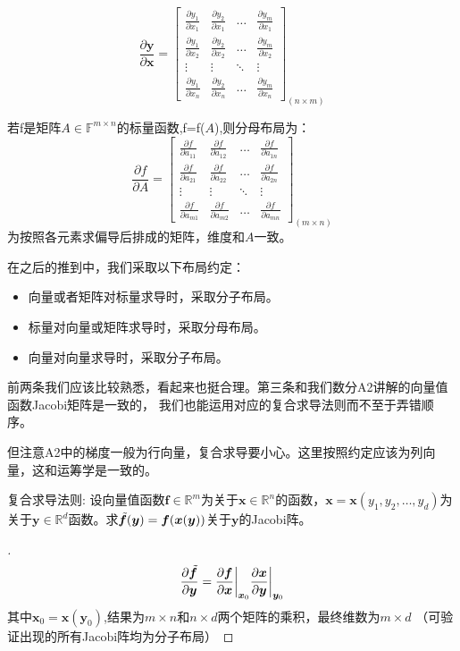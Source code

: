 \documentclass[cn,hazy,green,12pt,normal]{elegantnote}
\newcommand{\p}{\partial}
\newcommand{\MR}{\mathbb R}
\newcommand{\MF}{\mathbb F}
\numberwithin{equation}{section}
\numberwithin{subsection}{section}
\begin{document}
\[
\frac{\p \bm y}{\p \bm x} = \begin{bmatrix}
\frac{\p y_1}{\p x_1} &\frac{\p y_2}{\p x_1}  & \dotsc  & \frac{\p y_m}{\p x_1} \\
 \frac{\p y_1}{\p x_2}&\frac{\p y_2}{\p x_2}  &\dotsc  & \frac{\p y_m}{\p x_2}\\
\vdots  & \vdots  & \ddots  & \vdots \\
\frac{\p y_1}{\p x_n} & \frac{\p y_2}{\p x_n}  & \dotsc  & \frac{\p y_m}{\p x_n}
\end{bmatrix}_{(n\times m)}
\]

若f是矩阵$A\in \MF^{m\times n}$的标量函数,f=f($A$),则分母布局为：
\[
\frac{\p f}{\p A} = \begin{bmatrix}
\frac{\p f}{\p a_{11}} &\frac{\p f}{\p a_{12}}  & \dotsc  & \frac{\p f}{\p a_{1n}} \\
 \frac{\p f}{\p a_{21}}&\frac{\p f}{\p a_{22}}  &\dotsc  & \frac{\p f}{\p a_{2n}}\\
\vdots  & \vdots  & \ddots  & \vdots \\
\frac{\p f}{\p a_{m1}} & \frac{\p f}{\p a_{m2}}  & \dotsc  & \frac{\p f}{\p a_{mn}}
\end{bmatrix}_{(m\times n)}
\]
为按照各元素求偏导后排成的矩阵，维度和$A$一致。

在之后的推到中，我们采取以下布局约定：
\begin{itemize}
    \item 向量或者矩阵对标量求导时，采取分子布局。
    \item 标量对向量或矩阵求导时，采取分母布局。
    \item 向量对向量求导时，采取分子布局。
\end{itemize}

\begin{note}
    前两条我们应该比较熟悉，看起来也挺合理。第三条和我们数分A2讲解的向量值函数Jacobi矩阵是一致的，
    我们也能运用对应的复合求导法则而不至于弄错顺序。

    \noindent 但注意A2中的梯度一般为行向量，复合求导要小心。这里按照约定应该为列向量，这和运筹学是一致的。
\end{note}

\begin{example}{复合求导法则:}
    设向量值函数$\bm f \in \MR^m$为关于$\bm x \in \MR^n$的函数，$\bm x = \bm x(y_1,y_2,
    \dots, y_d)$为关于$\bm y \in \MR^d$函数。求$\Tilde{\bm f}(\bm y)=\bm f(\bm x(\bm y))$关于$\bm y$的Jacobi阵。
\end{example}

\begin{proof}[\solutionname]
\[
    \frac{\p \Tilde{\bm f}}{\p \bm y} = \frac{\p \bm f}{\p \bm x}\bigg|_{\bm x_0} \frac{\p \bm x}{\p \bm y}\bigg|_{\bm y_0}
\]
其中$\bm x_0=\bm x(\bm y_0)$,结果为$m\times n$和$n\times d$两个矩阵的乘积，最终维数为$m \times d$ （可验证出现的所有Jacobi阵均为分子布局）
\end{proof}
\end{document}

